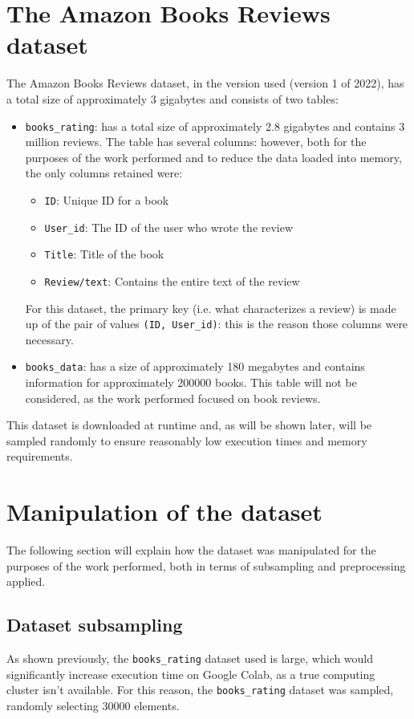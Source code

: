 \documentclass[12pt, a4paper[]{article}
\begin{document}
\section{The Amazon Books Reviews dataset}

The Amazon Books Reviews dataset, in the version used (version 1 of 2022), has a total size of approximately 3 gigabytes and consists of two tables:
\begin{itemize}
    \item \texttt{books\_rating}: has a total size of approximately 2.8 gigabytes 
    and contains 3 million reviews. The table has several columns: however, both 
    for the purposes of the work performed and to reduce the data loaded into memory, 
    the only columns retained were:
    \begin{itemize}
        \item \texttt{ID}: Unique ID for a book
        \item \texttt{User\_id}: The ID of the user who wrote the review
        \item \texttt{Title}: Title of the book
        \item \texttt{Review/text}: Contains the entire text of the review
    \end{itemize}
    For this dataset, the primary key (i.e. what characterizes a review) is made up of the pair of values \texttt{(ID, User\_id)}: this is the reason those columns were necessary. 
    \item \texttt{books\_data}: has a size of approximately 180 megabytes and 
    contains information for approximately 200000 books. 
    This table will not be considered, as the work performed focused on book reviews.
\end{itemize}
This dataset is downloaded at runtime and, as will be shown later, will be sampled randomly to ensure reasonably low execution times and memory requirements.


\section{Manipulation of the dataset}
The following section will explain how the dataset was manipulated for the purposes of the work performed, both in terms of subsampling and preprocessing applied.
\subsection{Dataset subsampling}
As shown previously, the \texttt{books\_rating} dataset used is large, which would significantly increase execution time on Google Colab, as a true computing cluster isn't available. For this reason, the \texttt{books\_rating} dataset was sampled, randomly selecting 30000 elements.
\end{document}

